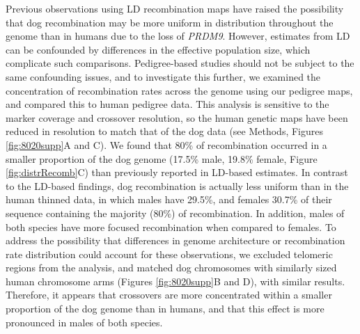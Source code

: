 {\begin{figure}[p]
    \vspace{-15pt}
\end{figure}
\clearpage}


Previous observations using LD recombination maps have raised the possibility that dog recombination may be more uniform in distribution throughout the genome than in humans due to the loss of \textit{PRDM9}\cite{Axelsson2012,Auton2013}.
However, estimates from LD can be confounded by differences in the effective population size, which complicate such comparisons.
Pedigree-based studies should not be subject to the same confounding issues, and
to investigate this further, we examined the concentration of recombination rates across the genome using our pedigree maps, and compared this to human pedigree data\cite{Campbell2015}.
This analysis is sensitive to the marker coverage and crossover resolution, so the human genetic maps have been reduced in resolution to match that of the dog data (see Methods, Figures \ref{fig:8020supp}A and C).
We found that 80\% of recombination occurred in a smaller proportion of the dog genome (17.5\% male, 19.8\% female, Figure \ref{fig:distrRecomb}C) than previously reported in LD-based estimates.
In contrast to the LD-based findings, dog recombination is actually less uniform than in the human thinned data,
in which males have 29.5\%, and females 30.7\% of their sequence containing the majority (80\%) of recombination.
In addition, males of both species have more focused recombination when compared to females.
To address the possibility that differences in genome architecture or recombination rate distribution could account for these observations, we excluded telomeric regions from the analysis, and matched dog chromosomes with similarly sized human chromosome arms (Figures \ref{fig:8020supp}B and D), with similar results.
Therefore, it appears that crossovers are more concentrated within a smaller proportion of the dog genome than in humans, and that this effect is more pronounced in males of both species.

